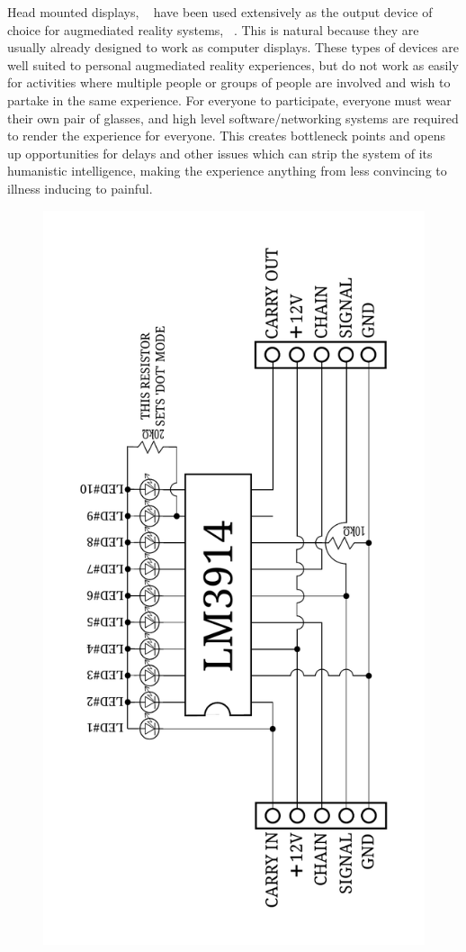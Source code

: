 \documentclass[conference]{sig-alternate-05-2015}
\begin{document}
Head mounted displays, ~\cite{mann1997wearable} have been used extensively as the output device of choice for augmediated reality systems, ~\cite{caudell1992augmented}. This is natural because they are usually already designed to work as computer displays. These types of devices are well suited to personal augmediated reality experiences, but do not work as easily for activities where multiple people or groups of people are involved and wish to partake in the same experience. For everyone to participate, everyone must wear their own pair of glasses, and high level software/networking systems are required to render the experience for everyone. This creates bottleneck points and opens up opportunities for delays and other issues which can strip the system of its humanistic intelligence, making the experience anything from less convincing to illness inducing to painful. ~\cite{drascic1996perceptual} \begin{figure}
\centering
\includegraphics[scale = 0.274, angle = 270]{3914schem.pdf}

\end{figure}
\end{document}
